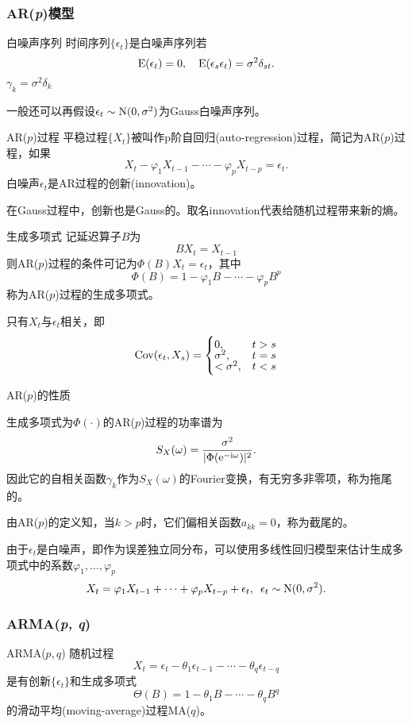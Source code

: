 \subsubsection{AR(\textit{p})模型}
\begin{definition}{白噪声序列}{}
	时间序列$\{\epsilon_t\}$是白噪声序列若
	\[
		\operatorname{E}(\epsilon_t)=0,\quad\operatorname{E}(\epsilon_s\epsilon_t)=\sigma^2\delta_{st}.
	\]
	$\gamma_k=\sigma^2\delta_k$
\end{definition}
一般还可以再假设$\epsilon_t\sim\operatorname{N}(0,\sigma^2)$为Gauss白噪声序列。
\begin{definition}{AR($p$)过程}{}
	平稳过程$\{X_t\}$被叫作p阶自回归(auto-regression)过程，简记为AR($p$)过程，如果
	\begin{equation}
		X_t-\varphi_1X_{t-1}-\cdots-\varphi_pX_{t-p}=\epsilon_t.
	\end{equation}
	白噪声$\epsilon_t$是AR过程的创新(innovation)。
\end{definition}
在Gauss过程中，创新也是Gauss的。取名innovation代表给随机过程带来新的熵。
\begin{definition}{生成多项式}{}
	记延迟算子$ B $为
	\[
		BX_t=X_{t-1}
	\]
	则AR($p$)过程的条件可记为$\Phi(B)X_t=\epsilon_t$，其中
	\begin{equation}
		\Phi(B)=1-\varphi_1B-\cdots-\varphi_pB^p
	\end{equation}
	称为AR($p$)过程的生成多项式。
\end{definition}
只有$X_t$与$\epsilon_t$相关，即
\begin{align*}
	\operatorname{Cov}(\epsilon_t,X_s)=\begin{cases}
		0,&t>s\\[-1ex]
		\sigma^2,&t=s\\[-1ex]
		<\sigma^2,&t<s
	\end{cases}
\end{align*}
\begin{theorem}{AR($p$)的性质}{}
	\begin{compactitem}
		\item 生成多项式为$\Phi(\cdot)$的AR($p$)过程的功率谱为
		\[
			S_X(\omega)=\frac{\sigma^2}{|\Phi(\mathop{}\!\mathrm{e}^{-\mathrm{i}\omega})|^2}.
		\]
		因此它的自相关函数$\gamma_k$作为$ S_X(\omega) $的Fourier变换，有无穷多非零项，称为拖尾的。
		\item 由AR($p$)的定义知，当$ k > p $时，它们偏相关函数$ a_{kk} = 0$，称为截尾的。
	\end{compactitem}
\end{theorem}
由于$\epsilon_t$是白噪声，即作为误差独立同分布，可以使用多线性回归模型来估计生成多项式中的系数$\varphi_1,\ldots,\varphi_p$
\[
	X_t=\varphi_1X_{t-1}+\cdots+\varphi_pX_{t-p}+\epsilon_t,\enspace\epsilon_t\sim\operatorname{N}(0,\sigma^2).
\]
\subsubsection{ARMA(\textit{p, q})}
\begin{definition}{ARMA($p,q$)}{}
	随机过程
	\[
		X_t=\epsilon_t-\theta_1\epsilon_{t-1}-\cdots-\theta_q\epsilon_{t-q}
	\]
	是有创新$\{\epsilon_t\}$和生成多项式
	\begin{equation}
		\Theta(B)=1-\theta_1B-\cdots-\theta_qB^q
	\end{equation}
	的滑动平均(moving-average)过程MA($q$)。
\end{definition}